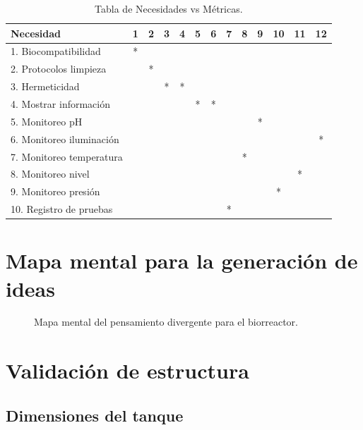 \documentclass[11pt,tesis,twoside,openright,spanish]{upiiztt}
\begin{document}
\begin{table}[H]
\centering
\caption{Tabla de Necesidades vs Métricas.}
\label{tab:nec_vs_met}
\small
\begin{tabular}{lcccccccccccc}
\toprule
\textbf{Necesidad} & \textbf{1} & \textbf{2} & \textbf{3} & \textbf{4} & \textbf{5} & \textbf{6} & \textbf{7} & \textbf{8} & \textbf{9} & \textbf{10} & \textbf{11} & \textbf{12} \\
\midrule
1. Biocompatibilidad       & * & & & & & & & & & & & \\
2. Protocolos limpieza     & & * & & & & & & & & & & \\
3. Hermeticidad            & & & * & * & & & & & & & & \\
4. Mostrar información     & & & & & * & * & & & & & & \\
5. Monitoreo pH            & & & & & & & & & * & & & \\
6. Monitoreo iluminación   & & & & & & & & & & & & * \\
7. Monitoreo temperatura   & & & & & & & & * & & & & \\
8. Monitoreo nivel         & & & & & & & & & & & * & \\
9. Monitoreo presión       & & & & & & & & & & * & & \\
10. Registro de pruebas    & & & & & & & * & & & & & \\
\bottomrule
\end{tabular}
\end{table}
\chapter{Mapa mental para la generación de ideas}
\label{ap:mapa_mental}

\begin{figure}[H]
  \centering
  \caption{Mapa mental del pensamiento divergente para el biorreactor.}
  \label{fig:mapa_mental}
\end{figure}
\chapter{Validación de estructura}
\label{ap:estructura}

\section*{Dimensiones del tanque}
\end{document}
